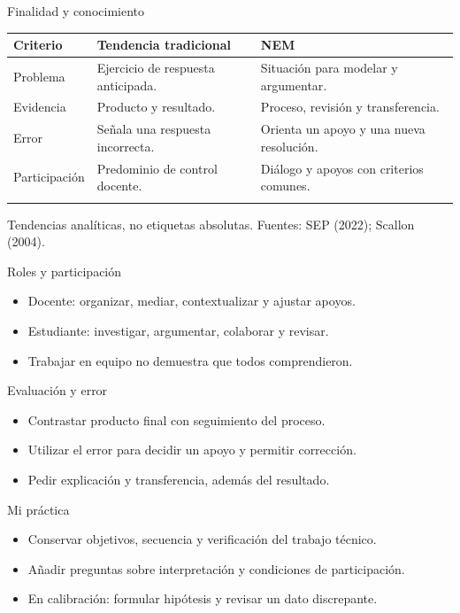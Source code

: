 \documentclass[
	spanish,
	aspectratio=1610,
	xcolor={dvipsnames,table}
]{beamer}
\begin{document}
\begin{frame}{Finalidad y conocimiento}
\small\renewcommand{\arraystretch}{1.45}\begin{tabularx}{\linewidth}{X|X|X}\toprule
\textbf{Criterio} & \textbf{Tendencia tradicional} & \textbf{NEM}\\\midrule
Problema & Ejercicio de respuesta anticipada. & Situación para modelar y argumentar.\\\addlinespace
Evidencia & Producto y resultado. & Proceso, revisión y transferencia.\\\addlinespace
Error & Señala una respuesta incorrecta. & Orienta un apoyo y una nueva resolución.\\\addlinespace
Participación & Predominio de control docente. & Diálogo y apoyos con criterios comunes.\\\addlinespace
\bottomrule\end{tabularx}\par\vspace{.2cm}\small Tendencias analíticas, no etiquetas absolutas. Fuentes: SEP (2022); Scallon (2004).
\end{frame}
\begin{frame}{Roles y participación}
\fontsize{14}{18}\selectfont\begin{itemize}\setlength{\itemsep}{.45cm}
\item Docente: organizar, mediar, contextualizar y ajustar apoyos.
\item Estudiante: investigar, argumentar, colaborar y revisar.
\item Trabajar en equipo no demuestra que todos comprendieron.
\end{itemize}
\end{frame}
\begin{frame}{Evaluación y error}
\fontsize{14}{18}\selectfont\begin{itemize}\setlength{\itemsep}{.45cm}
\item Contrastar producto final con seguimiento del proceso.
\item Utilizar el error para decidir un apoyo y permitir corrección.
\item Pedir explicación y transferencia, además del resultado.
\end{itemize}
\end{frame}
\begin{frame}{Mi práctica}
\fontsize{14}{18}\selectfont\begin{itemize}\setlength{\itemsep}{.45cm}
\item Conservar objetivos, secuencia y verificación del trabajo técnico.
\item Añadir preguntas sobre interpretación y condiciones de participación.
\item En calibración: formular hipótesis y revisar un dato discrepante.
\end{itemize}
\end{frame}
\end{document}
